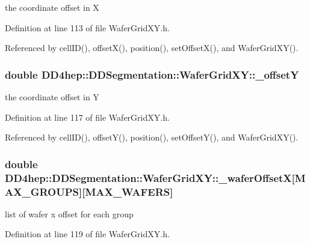 the coordinate offset in X 

Definition at line 113 of file WaferGridXY.h.

Referenced by cellID(), offsetX(), position(), setOffsetX(), and WaferGridXY().\hypertarget{class_d_d4hep_1_1_d_d_segmentation_1_1_wafer_grid_x_y_a560e795ea397f1a782c15d1e782f70ae}{
\subsubsection[{\_\-offsetY}]{\setlength{\rightskip}{0pt plus 5cm}double {\bf DD4hep::DDSegmentation::WaferGridXY::\_\-offsetY}}}
\label{class_d_d4hep_1_1_d_d_segmentation_1_1_wafer_grid_x_y_a560e795ea397f1a782c15d1e782f70ae}


the coordinate offset in Y 

Definition at line 117 of file WaferGridXY.h.

Referenced by cellID(), offsetY(), position(), setOffsetY(), and WaferGridXY().\hypertarget{class_d_d4hep_1_1_d_d_segmentation_1_1_wafer_grid_x_y_ad9ff5f530eeddcdbe40f2362a96bcd84}{
\subsubsection[{\_\-waferOffsetX}]{\setlength{\rightskip}{0pt plus 5cm}double {\bf DD4hep::DDSegmentation::WaferGridXY::\_\-waferOffsetX}\mbox{[}MAX\_\-GROUPS\mbox{]}\mbox{[}MAX\_\-WAFERS\mbox{]}}}
\label{class_d_d4hep_1_1_d_d_segmentation_1_1_wafer_grid_x_y_ad9ff5f530eeddcdbe40f2362a96bcd84}


list of wafer x offset for each group 

Definition at line 119 of file WaferGridXY.h.

